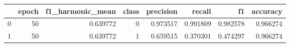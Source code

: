\begin{tabular}{lrrrrrrr}
\toprule
 & epoch & f1_harmonic_mean & class & precision & recall & f1 & accuracy \\
\midrule
0 & 50 & 0.639772 & 0 & 0.973517 & 0.991809 & 0.982578 & 0.966274 \\
1 & 50 & 0.639772 & 1 & 0.659515 & 0.370301 & 0.474297 & 0.966274 \\
\bottomrule
\end{tabular}
